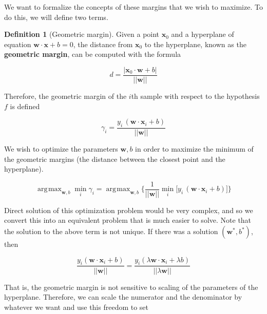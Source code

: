 \documentclass{article}
\DeclareMathOperator*{\argmax}{\arg\!\max}
\theoremstyle{definition}
\newtheorem{definition}{Definition}[section]
\begin{document}
  We want to formalize the concepts of these margins that we wish to maximize. To do this, we will define two terms. 

  \begin{definition}[Geometric margin]
    Given a point $\mathbf{x}_0$ and a hyperplane of equation $\mathbf{w} \cdot \mathbf{x} + b = 0$, the distance from $\mathbf{x}_0$ to the hyperplane, known as the \textbf{geometric margin}, can be computed with the formula 

    \begin{equation*}
      d = \frac{|\mathbf{x}_0 \cdot \mathbf{w} + b|}{||\mathbf{w}||}  
    \end{equation*} 

    Therefore, the geometric margin of the $i$th sample with respect to the hypothesis $f$ is defined 

    \begin{equation*}
      \gamma_i = \frac{y_i \, (\mathbf{w} \cdot \mathbf{x}_i + b)}{||\mathbf{w}||} 
    \end{equation*} 
  \end{definition}

  We wish to optimize the parameters $\mathbf{w}, b$ in order to maximize the minimum of the geometric margins (the distance between the closest point and the hyperplane). 

  \begin{equation*}
    \argmax_{\mathbf{w}, b} \min_i \gamma_i = \argmax_{\mathbf{w}, b} \bigg\{ \frac{1}{||\mathbf{w}||} \min_i \big[y_i \, (\mathbf{w} \cdot \mathbf{x}_i + b) \big] \bigg\}
  \end{equation*}

  Direct solution of this optimization problem would be very complex, and so we convert this into an equivalent problem that is much easier to solve. Note that the solution to the above term is not unique. If there was a solution $(\mathbf{w}^\ast, b^\ast)$, then 

  \begin{equation*}
    \frac{y_i (\mathbf{w} \cdot \mathbf{x}_i + b)}{||\mathbf{w}||} = \frac{y_i (\lambda \mathbf{w} \cdot \mathbf{x}_i + \lambda b)}{||\lambda \mathbf{w}||}  
  \end{equation*}

  That is, the geometric margin is not sensitive to scaling of the parameters of the hyperplane. Therefore, we can scale the numerator and the denominator by whatever we want and use this freedom to set 
\end{document}
